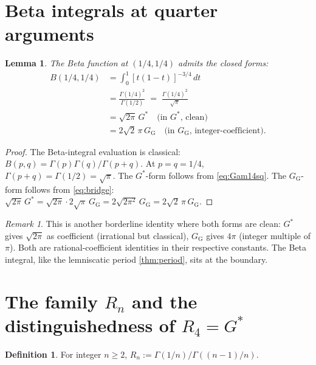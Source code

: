 \documentclass[11pt]{article}
\newtheorem{lemma}[theorem]{Lemma}
\theoremstyle{definition}
\newtheorem{definition}[theorem]{Definition}
\theoremstyle{remark}
\newtheorem*{remark}{Remark}
\newcommand{\Gs}{G^{*}}
\newcommand{\GG}{G_{\!\scriptscriptstyle\mathrm{G}}}
\begin{document}
\section{Beta integrals at quarter arguments}\label{sec:beta}

\begin{lemma}\label{lem:beta-quarter}
The Beta function at $(1/4, 1/4)$ admits the closed forms:
\begin{align}
B(1/4, 1/4) &= \int_0^1 [t(1-t)]^{-3/4}\,dt \\
&= \frac{\Gamma(1/4)^2}{\Gamma(1/2)} \;=\; \frac{\Gamma(1/4)^2}{\sqrt\pi} \\
&= \sqrt{2\pi}\,\Gs \quad \text{(in $\Gs$, clean)}\\
&= 2\sqrt 2\,\pi\,\GG \quad \text{(in $\GG$, integer-coefficient).}
\end{align}
\end{lemma}

\begin{proof}
The Beta-integral evaluation is classical: $B(p,q) = \Gamma(p)\Gamma(q)/\Gamma(p+q)$.
At $p = q = 1/4$, $\Gamma(p+q) = \Gamma(1/2) = \sqrt\pi$. The $\Gs$-form
follows from \eqref{eq:Gam14sq}. The $\GG$-form follows from \eqref{eq:bridge}:
$\sqrt{2\pi}\,\Gs = \sqrt{2\pi}\cdot 2\sqrt\pi\,\GG = 2\sqrt{2\pi^2}\,\GG = 2\sqrt 2\,\pi\,\GG$.
\end{proof}

\begin{remark}
This is another borderline identity where both forms are clean: $\Gs$ gives
$\sqrt{2\pi}$ as coefficient (irrational but classical), $\GG$ gives $4\pi$
(integer multiple of $\pi$). Both are rational-coefficient identities in
their respective constants. The Beta integral, like the lemniscatic period
\eqref{thm:period}, sits at the boundary.
\end{remark}

\section{The family $R_n$ and the distinguishedness of $R_4 = \Gs$}\label{sec:family}

\begin{definition}
For integer $n \geq 2$, $R_n := \Gamma(1/n)/\Gamma((n-1)/n)$.
\end{definition}
\end{document}
